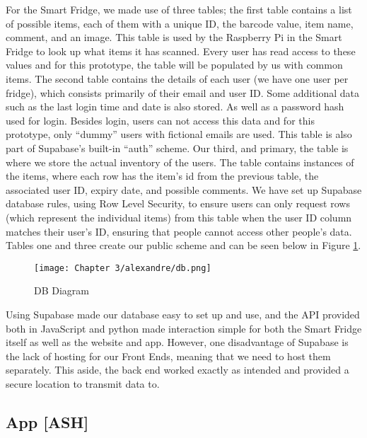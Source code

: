 For the Smart Fridge, we made use of three tables; the first table contains a list of possible items, each of them with a unique ID, the barcode value, item name, comment, and an image.
This table is used by the Raspberry Pi in the Smart Fridge to look up what items it has scanned.
Every user has read access to these values and for this prototype, the table will be populated by us with common items.
The second table contains the details of each user (we have one user per fridge), which consists primarily of their email and user ID.
Some additional data such as the last login time and date is also stored.
As well as a password hash used for login.
Besides login, users can not access this data and for this prototype, only “dummy” users with fictional emails are used.
This table is also part of Supabase's built-in “auth” scheme.
Our third, and primary, the table is where we store the actual inventory of the users.
The table contains instances of the items, where each row has the item's id from the previous table, the associated user ID, expiry date, and possible comments.
We have set up Supabase database rules, using Row Level Security, to ensure users can only request rows (which represent the individual items) from this table when the user ID column matches their user's ID, ensuring that people cannot access other people's data.
Tables one and three create our public scheme and can be seen below in Figure \ref{fig:DB_Diagram}.

\begin{figure}[H]        
    \centering
    \texttt{[image: Chapter 3/alexandre/db.png]}
    \caption{DB Diagram}
    \label{fig:DB_Diagram}
\end{figure} 

Using Supabase made our database easy to set up and use, and the API provided both in JavaScript and python made interaction simple for both the Smart Fridge itself as well as the website and app.
However, one disadvantage of Supabase is the lack of hosting for our Front Ends, meaning that we need to host them separately.
This aside, the back end worked exactly as intended and provided a secure location to transmit data to.

\subsection{App [ASH]}

